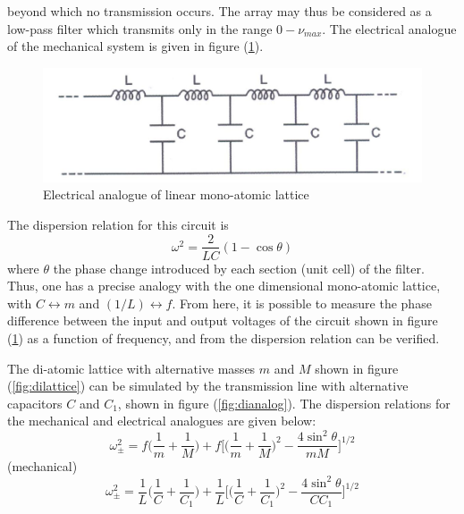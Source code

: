 \documentclass[%
 aip,
 amsmath,amssymb,
 reprint, floatfix%
]{revtex4-1}
\begin{document}
    beyond which no transmission occurs. The array may thus be considered as a low-pass filter which transmits only in the range $0 - \nu_{max}$. The electrical analogue of the mechanical system is given in figure (\ref{fig:monoanalog}).
    \begin{figure}
        \centering
        \includegraphics[scale = 0.75]{Figures/monolatticeanalog.png}
        \caption{Electrical analogue of linear mono-atomic lattice}
        \label{fig:monoanalog}
    \end{figure}
    The dispersion relation for this circuit is
    \begin{equation}
        \omega^2 = \dfrac{2}{LC}(1-\cos \theta)
    \end{equation}
    where $\theta$ the phase change introduced by each section (unit cell) of the filter. Thus, one has a precise analogy with the one dimensional mono-atomic lattice, with $C \leftrightarrow m$ and $(1/L) \leftrightarrow f$. From here, it is possible to measure the phase difference between the input and output voltages of the circuit shown in figure (\ref{fig:monoanalog}) as a function of frequency, and from the dispersion relation can be verified.
    \par
    The di-atomic lattice with alternative masses $m$ and $M$ shown in figure (\ref{fig:dilattice}) can be simulated by the transmission line with alternative capacitors $C$ and $C_1$, shown in figure (\ref{fig:dianalog}). The dispersion relations for the mechanical and electrical analogues are given below:
    \begin{equation}
        \omega_{\pm}^2 = f \Bigg(\dfrac{1}{m} + \dfrac{1}{M}\Bigg) + f \Bigg[ \Bigg(\dfrac{1}{m} + \dfrac{1}{M}\Bigg)^2 - \dfrac{4 \sin^2 \theta}{mM} \Bigg]^{1/2}
    \end{equation}
    (mechanical)
    \begin{equation}
        \omega_{\pm}^2 = \dfrac{1}{L} \Bigg(\dfrac{1}{C} + \dfrac{1}{C_1}\Bigg) + \dfrac{1}{L} \Bigg[ \Bigg(\dfrac{1}{C} + \dfrac{1}{C_1}\Bigg)^2 - \dfrac{4 \sin^2 \theta}{CC_1} \Bigg]^{1/2}
    \end{equation}
\end{document}
